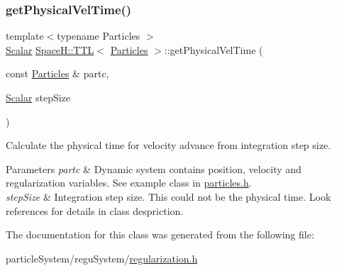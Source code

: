 \subsubsection{\texorpdfstring{get\+Physical\+Vel\+Time()}{getPhysicalVelTime()}}
{\footnotesize\ttfamily template$<$typename Particles $>$ \\
\mbox{\hyperlink{class_space_h_1_1_t_t_l_a8d0bb489470e6da1bcaf70a9eb38d96d}{Scalar}} \mbox{\hyperlink{class_space_h_1_1_t_t_l}{Space\+H\+::\+T\+TL}}$<$ \mbox{\hyperlink{struct_space_h_1_1_particles}{Particles}} $>$\+::get\+Physical\+Vel\+Time (\begin{DoxyParamCaption}\item[{const \mbox{\hyperlink{struct_space_h_1_1_particles}{Particles}} \&}]{partc,  }\item[{\mbox{\hyperlink{class_space_h_1_1_t_t_l_a8d0bb489470e6da1bcaf70a9eb38d96d}{Scalar}}}]{step\+Size }\end{DoxyParamCaption})\hspace{0.3cm}{\ttfamily [inline]}}



Calculate the physical time for velocity advance from integration step size. 


\begin{DoxyParams}{Parameters}
{\em partc} & Dynamic system contains position, velocity and regularization variables. See example class in \mbox{\hyperlink{particles_8h}{particles.\+h}}. \\
\hline
{\em step\+Size} & Integration step size. This could not be the physical time. Look references for details in class despriction. \\
\hline
\end{DoxyParams}


The documentation for this class was generated from the following file\+:\begin{DoxyCompactItemize}
\item 
particle\+System/regu\+System/\mbox{\hyperlink{regularization_8h}{regularization.\+h}}\end{DoxyCompactItemize}
